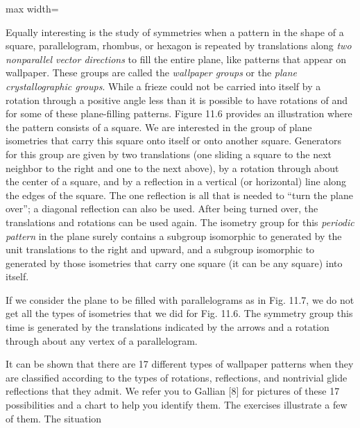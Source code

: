 \documentclass[11pt,oneside]{article}
\begin{document}
\begin{BookBody}
\begin{center}\begin{adjustbox}{max width=\linewidth}\end{adjustbox}\end{center}

Equally interesting is the study of symmetries when a pattern in the shape of a square, parallelogram, rhombus, or hexagon is repeated by translations along\textit{ two non}\textit{parallel vector directions} to fill the entire plane, like patterns that appear on wallpaper. These groups are called the\textit{ wallpaper groups} or the\textit{ plane crystallographic groups}. While a frieze could not be carried into itself by a rotation through a positive angle less than  it is possible to have rotations of  and  for some of these plane-filling patterns. Figure 11.6 provides an illustration where the pattern consists of a square. We are interested in the group of plane isometries that carry this square onto itself or onto another square. Generators for this group are given by two translations (one sliding a square to the next neighbor to the right and one to the next above), by a rotation through  about the center of a square, and by a reflection in a vertical (or horizontal) line along the edges of the square. The one reflection is all that is needed to “turn the plane over”; a diagonal reflection can also be used. After being turned over, the translations and rotations can be used again. The isometry group for this\textit{ periodic} \textit{pattern} in the plane surely contains a subgroup isomorphic to  generated by the unit translations to the right and upward, and a subgroup isomorphic to  generated by those isometries that carry one square (it can be any square) into itself.

If we consider the plane to be filled with parallelograms as in Fig. 11.7, we do not get all the types of isometries that we did for Fig. 11.6. The symmetry group this time is generated by the translations indicated by the arrows and a rotation through  about any vertex of a parallelogram.

It can be shown that there are 17 different types of wallpaper patterns when they are classified according to the types of rotations, reflections, and nontrivial glide reflections that they admit. We refer you to Gallian [8] for pictures of these 17 possibilities and a chart to help you identify them. The exercises illustrate a few of them. The situation

\end{BookBody}
\end{document}
